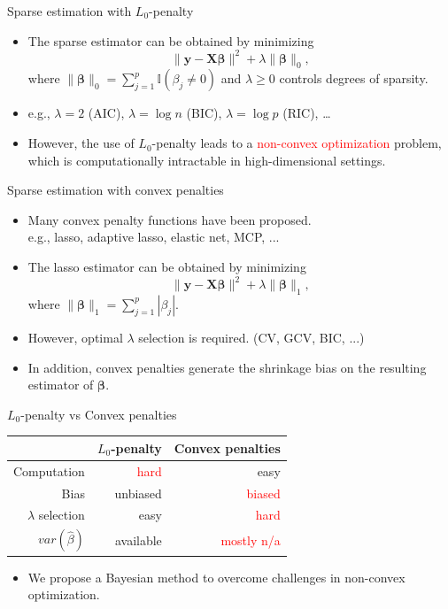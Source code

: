 \documentclass[citecolor=blue,10pt]{beamer}
\newcommand{\0} {\mbox{\boldmath$0$}}
\newcommand{\uy}{{\boldsymbol y}}
\newcommand{\uX}{{\boldsymbol X}}
\newcommand{\ubeta}{{\boldsymbol \beta}}
\begin{document}
\begin{frame}{Sparse estimation with $L_0$-penalty}
\begin{itemize}\itemsep=6mm

 \item The sparse  estimator can be obtained by minimizing 
 $$ \|\uy-\uX\ubeta\|^2 +\lambda \|\ubeta\|_0,$$
 where $\|\ubeta\|_0=\sum_{j=1}^p \mathbb{I}(\beta_j\neq 0)$ and $\lambda \geq 0$ controls degrees of sparsity.
 \item e.g., $\lambda=2$ (AIC), $\lambda=\log n$ (BIC), $\lambda =\log p $ (RIC), \ldots
 \pause \item However, the use of $L_0$-penalty leads to a \textcolor{red}{non-convex optimization} problem, which is computationally intractable in high-dimensional settings.
\end{itemize}
\end{frame}

\begin{frame}{Sparse estimation with convex penalties}
\begin{itemize}\itemsep=5mm
\item Many convex penalty functions have been proposed. 
\\e.g., lasso, adaptive lasso, elastic net, MCP, ... 
\item The lasso estimator \citep{tibshirani1996regression} can be obtained by minimizing 
 $$ \|\uy-\uX\ubeta\|^2 +\lambda \|\ubeta\|_1,$$
 where $\|\ubeta\|_1=\sum_{j=1}^p |\beta_j|$.
\pause \item However, optimal $\lambda$ selection is required. (CV, GCV, BIC, ...)
 
 \item In addition, convex penalties generate the shrinkage bias on the resulting estimator of $\ubeta$. 
\end{itemize}
\end{frame}
\begin{frame}{$L_0$-penalty vs Convex penalties} 
\begin{table}[ht]
\centering
\begin{tabular}{rrr}
  \hline
 &$L_0$-penalty & Convex penalties \\ 
  \hline
Computation & \textcolor{red}{hard} &easy \\
Bias & unbiased & \textcolor{red}{biased} \\
$\lambda$ selection & easy & \textcolor{red}{hard} \\
$var(\hat{\beta})$& available& \textcolor{red}{mostly n/a} \\
   \hline
\end{tabular}
\end{table}
\vspace{5mm}
\begin{itemize}
 \item We propose a Bayesian method to overcome challenges in non-convex optimization.
\end{itemize}
\end{frame}
\end{document}
